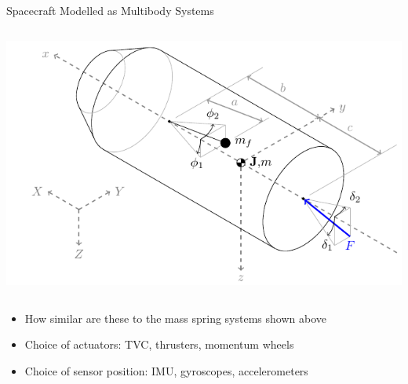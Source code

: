 \documentclass{beamer}
\begin{document}
\begin{frame}{Spacecraft Modelled as Multibody Systems}
\begin{columns}
\includegraphics[width=\textwidth]{images/rocket3.pdf}
\end{columns}
\begin{itemize}
\item How similar are these to the mass spring systems shown above
\item Choice of actuators: TVC, thrusters, momentum wheels
\item Choice of sensor position: IMU, gyroscopes, accelerometers
\end{itemize}
\end{frame}

\end{document}
